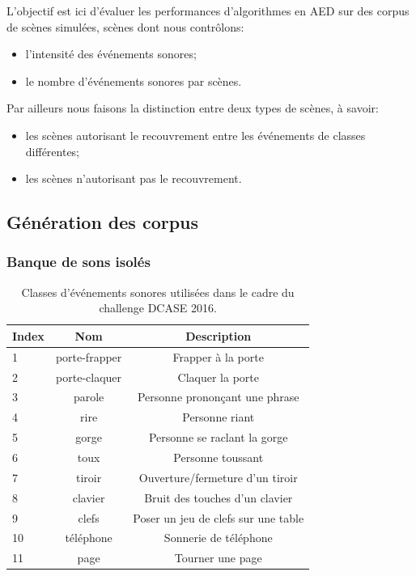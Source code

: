 L'objectif est ici d'évaluer les performances d'algorithmes en AED sur des corpus de scènes simulées, scènes dont nous contrôlons:

\begin{itemize}
\item l'intensité des événements sonores;
\item le nombre d'événements sonores par scènes.
\end{itemize}

Par ailleurs nous faisons la distinction entre deux types de scènes, à savoir:

\begin{itemize}
\item les scènes autorisant le recouvrement entre les événements de classes différentes;
\item les scènes n'autorisant pas le recouvrement.
\end{itemize}

\subsection{Génération des corpus}

\subsubsection{Banque de sons isolés}

\begin{table}[t]
\begin{center}
\begin{tabular}{lcc}
\textbf{Index} & \textbf{Nom}  & \textbf{Description}  \\ 
\hline
1   & porte-frapper & Frapper à la porte \\
2   & porte-claquer & Claquer la porte \\
3   & parole        & Personne prononçant une phrase \\
4   & rire          & Personne riant  \\    
5   & gorge         & Personne se raclant la gorge  \\
6   & toux          & Personne toussant \\
7   & tiroir        & Ouverture/fermeture d'un tiroir \\
8   & clavier       & Bruit des touches d'un clavier \\
9   & clefs         & Poser un jeu de clefs sur une table \\    
10  & téléphone     & Sonnerie de téléphone \\
11  & page          & Tourner une page \\     
\hline      
\end{tabular}
\end{center}
\caption{Classes d'événements sonores utilisées dans le cadre du challenge DCASE 2016.}
\label{tab:eventDCASE2016}
\end{table}

